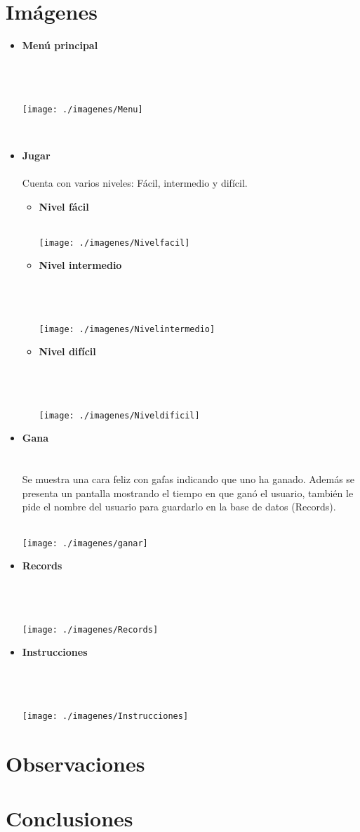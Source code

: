 \documentclass[11pt]{article} %
\begin{document}
\section{\fontsize{14}{0} \bf Imágenes}
\begin{itemize}
\item {\bf Menú principal}\\\\\\\\
 \centerline{\texttt{[image: ./imagenes/Menu]}}\\
\newpage
\item {\bf Jugar}\\\\
Cuenta con varios niveles: Fácil, intermedio y difícil.
\begin{itemize}
\item {\bf Nivel fácil}\\\\
  \centerline{\texttt{[image: ./imagenes/Nivelfacil]}}
\newpage
\item {\bf Nivel intermedio}\\\\\\\\
  \centerline{\texttt{[image: ./imagenes/Nivelintermedio]}}
\newpage
\item {\bf Nivel difícil}\\\\\\\\
 \centerline{ \texttt{[image: ./imagenes/Niveldificil]}}
\end{itemize}
\newpage
\item {\bf Gana}\\\\\\
Se muestra una cara feliz con gafas indicando que uno ha ganado. Además se presenta un pantalla mostrando el tiempo en que ganó el usuario, también le pide el nombre del usuario para guardarlo en la base de datos (Records).\\\\
  \centerline{\texttt{[image: ./imagenes/ganar]}}
\newpage
\item {\bf Records}\\\\\\\\
 \centerline{\texttt{[image: ./imagenes/Records]}}
\newpage
\item {\bf Instrucciones}\\\\\\\\
 \centerline{\texttt{[image: ./imagenes/Instrucciones]}}


\end{itemize}

\section{\fontsize{14}{0} \bf Observaciones}
\section{\fontsize{14}{0} \bf Conclusiones}
\end{document}
